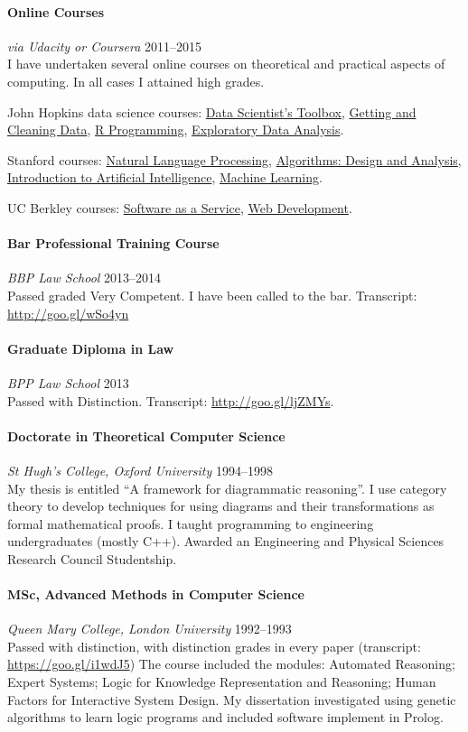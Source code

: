\documentclass[11pt,a4paper]{article}
\newcommand{\centry}[3]{\paragraph{#1} \textit{#2}%
\hfill#3\\[2pt]}
\begin{document}
\centry{Online Courses}{\emph{via} Udacity or Coursera}{2011--2015} I have undertaken several online courses
on theoretical and practical aspects of computing. In all cases I attained high
grades.
\begin{enumerate*}[label=(\alph*)]
\item John Hopkins data science courses:
  \href{https://drive.google.com/open?id=0BzIgco934WByWEt1RVdxazVSckk}{Data
    Scientist's Toolbox},
  \href{https://drive.google.com/open?id=0BzIgco934WByeWdrM0pNMndVS2M}{Getting
    and Cleaning Data},
  \href{https://drive.google.com/open?id=0BzIgco934WBydkxiNGJTUFNCQVU}{R
    Programming},
  \href{https://drive.google.com/open?id=0BzIgco934WByTmtVYjl3MXROZG8}{Exploratory
    Data Analysis}.
\item Stanford courses:
  \href{https://drive.google.com/open?id=0BzIgco934WByR3NldDVjVTFfR2s}{Natural
    Language Processing},
  \href{https://drive.google.com/open?id=0BzIgco934WByZ0VLRm1KWjlTaGM}{Algorithms:
    Design and Analysis},
  \href{https://drive.google.com/open?id=0BzIgco934WBydEY5TWJVcmltREk}{Introduction
    to Artificial Intelligence}, \href{https://drive.google.com/open?id=0BzIgco934WByZ0VLRm1KWjlTaGM}{Machine Learning}.
\item UC Berkley courses: \href{https://drive.google.com/open?id=0BzIgco934WByZ0VLRm1KWjlTaGM}{Software as a Service}, \href{https://drive.google.com/open?id=0BzIgco934WByRDJJYWpCZkx0OHc}{Web Development}.
\end{enumerate*}

\centry{Bar Professional Training Course}{BBP Law School}{2013--2014}
 Passed graded Very Competent. I have been called to the bar. Transcript:
\url{http://goo.gl/wSo4yn}


\centry{Graduate Diploma in Law}{BPP Law School}{2013} 
Passed with Distinction. Transcript: \url{http://goo.gl/ljZMYs}.

\centry{Doctorate in Theoretical Computer Science}{St Hugh's College, Oxford
  University} {1994--1998} My thesis is entitled ``A framework for diagrammatic
reasoning''. I use category theory to develop techniques for using diagrams and
their transformations as formal mathematical proofs.  I taught programming to
engineering undergraduates (mostly C++).  Awarded an Engineering and Physical
Sciences Research Council Studentship.


\centry{MSc, Advanced Methods in Computer Science}{Queen Mary College, London
  University}{1992--1993} Passed with distinction, with distinction grades in
every paper (transcript: \url{https://goo.gl/i1wdJ5}) The course included the
modules: Automated Reasoning; Expert Systems; Logic for Knowledge
Representation and Reasoning; Human Factors for Interactive System Design.  My
dissertation investigated using genetic algorithms to learn logic programs and
included software implement in Prolog.
\end{document}
